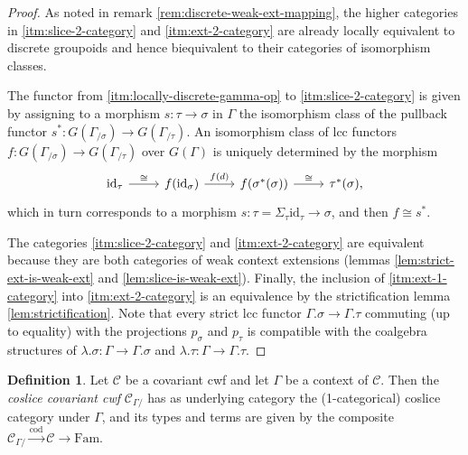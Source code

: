 \documentclass[a4paper]{article}
\theoremstyle{remark}
\theoremstyle{definition}
\newtheorem{definition}[theorem]{Definition}
\begin{document}
\begin{proof}
  As noted in remark \ref{rem:discrete-weak-ext-mapping}, the higher categories in \ref{itm:slice-2-category} and \ref{itm:ext-2-category} are already locally equivalent to discrete groupoids and hence biequivalent to their categories of isomorphism classes.

  The functor from \ref{itm:locally-discrete-gamma-op} to \ref{itm:slice-2-category} is given by assigning to a morphism $s : \tau \rightarrow \sigma$ in $\Gamma$ the isomorphism class of the pullback functor $s^* : G(\Gamma_{/ \sigma}) \rightarrow G(\Gamma_{/ \tau})$.
  An isomorphism class of lcc functors $f : G(\Gamma_{/ \sigma}) \rightarrow G(\Gamma_{/ \tau})$ over $G(\Gamma)$ is uniquely determined by the morphism
  \begin{equation}
    \begin{tikzcd}
      \mathrm{id}_\tau \arrow[r, "\cong"] & f(\mathrm{id}_\sigma) \arrow[r, "f(d)"] & f(\sigma^*(\sigma)) \arrow[r, "\cong"] & \tau^*(\sigma),
    \end{tikzcd}
  \end{equation}
  which in turn corresponds to a morphism $s : \tau = \Sigma_\tau \mathrm{id}_\tau \rightarrow \sigma$, and then $f \cong s^*$.

  The categories \ref{itm:slice-2-category} and \ref{itm:ext-2-category} are equivalent because they are both categories of weak context extensions (lemmas \ref{lem:strict-ext-is-weak-ext} and \ref{lem:slice-is-weak-ext}).
  Finally, the inclusion of \ref{itm:ext-1-category} into \ref{itm:ext-2-category} is an equivalence by the strictification lemma \ref{lem:strictification}.
  Note that every strict lcc functor $\Gamma.\sigma \rightarrow \Gamma.\tau$ commuting (up to equality) with the projections $p_\sigma$ and $p_\tau$ is compatible with the coalgebra structures of $\lambda.\sigma : \Gamma \rightarrow \Gamma.\sigma$ and $\lambda.\tau : \Gamma \rightarrow \Gamma.\tau$.
\end{proof}

\begin{definition}
  Let $\mathcal{C}$ be a covariant cwf and let $\Gamma$ be a context of $ \mathcal{C}$.
  Then the \emph{coslice covariant cwf} $\mathcal{C}_{\Gamma /}$ has as underlying category the (1-categorical) coslice category under $\Gamma$, and its types and terms are given by the composite $\mathcal{C}_{\Gamma /} \xrightarrow{\mathrm{cod}} \mathcal{C} \rightarrow \mathrm{Fam}$.
\end{definition}
\end{document}
